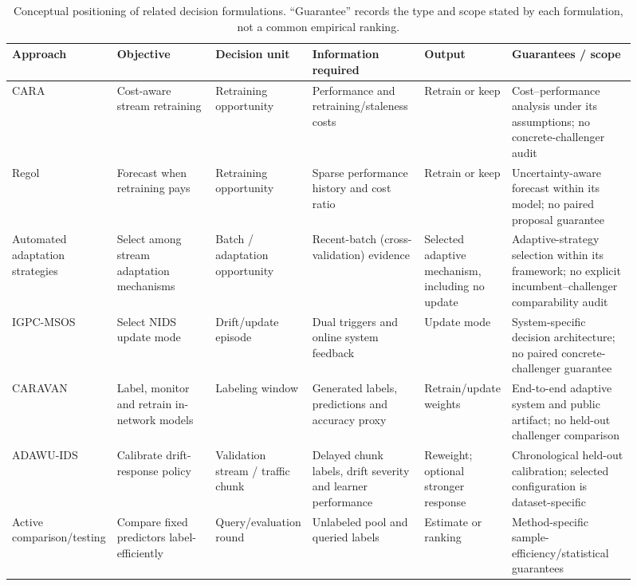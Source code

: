 \documentclass[a4paper,fleqn]{cas-sc}
\begin{document}
\begin{table}[t]
\centering
\caption{Conceptual positioning of related decision formulations. ``Guarantee'' records the type and scope stated by each formulation, not a common empirical ranking.}
\label{tab:positioning}
\scriptsize
\setlength{\tabcolsep}{2pt}
\renewcommand{\arraystretch}{1.12}
\begin{tabular}{p{0.12\linewidth} p{0.16\linewidth} p{0.12\linewidth} p{0.18\linewidth} p{0.13\linewidth} p{0.20\linewidth}}
\toprule
Approach & Objective & Decision unit & Information required & Output & Guarantees / scope \\
\midrule
CARA \cite{mahadevan2024cost} & Cost-aware stream retraining & Retraining opportunity & Performance and retraining/staleness costs & Retrain or keep & Cost--performance analysis under its assumptions; no concrete-challenger audit \\
Regol \cite{regol2025retrain} & Forecast when retraining pays & Retraining opportunity & Sparse performance history and cost ratio & Retrain or keep & Uncertainty-aware forecast within its model; no paired proposal guarantee \\
Automated adaptation strategies \cite{bakirov2021automated} & Select among stream adaptation mechanisms & Batch / adaptation opportunity & Recent-batch (cross-validation) evidence & Selected adaptive mechanism, including no update & Adaptive-strategy selection within its framework; no explicit incumbent--challenger comparability audit \\
IGPC-MSOS \cite{shyaa2026igpcmsos} & Select NIDS update mode & Drift/update episode & Dual triggers and online system feedback & Update mode & System-specific decision architecture; no paired concrete-challenger guarantee \\
CARAVAN \cite{zhang2024caravan} & Label, monitor and retrain in-network models & Labeling window & Generated labels, predictions and accuracy proxy & Retrain/update weights & End-to-end adaptive system and public artifact; no held-out challenger comparison \\
ADAWU-IDS \cite{yuan2026adawu} & Calibrate drift-response policy & Validation stream / traffic chunk & Delayed chunk labels, drift severity and learner performance & Reweight; optional stronger response & Chronological held-out calibration; selected configuration is dataset-specific \\
Active comparison/testing \cite{sawade2012active,kossen2021active} & Compare fixed predictors label-efficiently & Query/evaluation round & Unlabeled pool and queried labels & Estimate or ranking & Method-specific sample-efficiency/statistical guarantees \\

\end{tabular}
\end{table}
\end{document}
